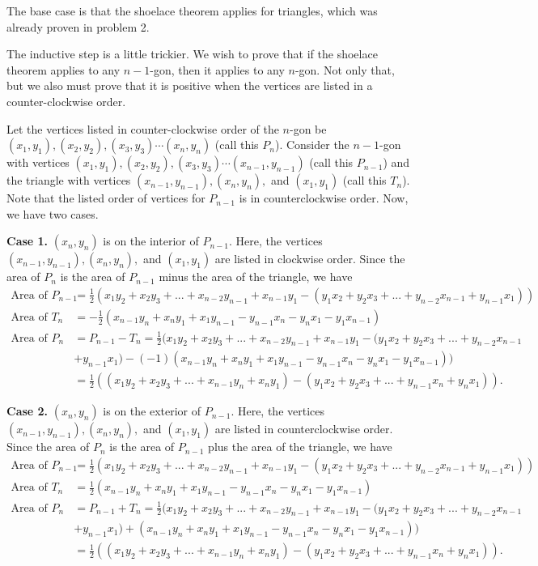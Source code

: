 \documentclass[11pt]{article}
\begin{document}
\begin{solution}
The base case is that the shoelace theorem applies for triangles, which was already proven in problem 2.

The inductive step is a little trickier. We wish to prove that if the shoelace theorem applies to any $n-1$-gon, then it applies to any $n$-gon. Not only that, but we also must prove that it is positive when the vertices are listed in a counter-clockwise order.

Let the vertices listed in counter-clockwise order of the $n$-gon be $(x_1, y_1), (x_2, y_2), (x_3, y_3) \cdots (x_n, y_n)$ (call this $P_n$). Consider the $n-1$-gon with vertices $(x_1, y_1), (x_2, y_2), (x_3, y_3) \cdots (x_{n-1}, y_{n-1})$ (call this $P_{n-1}$) and the triangle with vertices $(x_{n-1}, y_{n-1}), (x_n, y_n),$ and $(x_1, y_1)$ (call this $T_n$). Note that the listed order of vertices for $P_{n-1}$ is in counterclockwise order. Now, we have two cases.

\textbf{Case 1.} $(x_n, y_n)$ is on the interior of $P_{n-1}$.
Here, the vertices $(x_{n-1}, y_{n-1}), (x_n, y_n),$ and $(x_1, y_1)$ are listed in clockwise order. Since the area of $P_n$ is the area of $P_{n-1}$ minus the area of the triangle, we have 
\begin{align*}
    \textrm{Area of } P_{n-1} &= \frac{1}{2}(x_1y_2 + x_2y_3 + ... + x_{n-2}y_{n-1} + x_{n-1}y_1-(y_1x_2 + y_2x_3 + ... + y_{n-2}x_{n-1} + y_{n-1}x_1)) \\
    \textrm{Area of } T_n &= -\frac{1}{2}(x_{n-1}y_n+x_ny_1+x_1y_{n-1}-y_{n-1}x_n-y_nx_1-y_1x_{n-1}) \\
    \textrm{Area of }P_n &= P_{n-1} - T_n = \frac{1}{2}(x_1y_2 + x_2y_3 + ... + x_{n-2}y_{n-1} + x_{n-1}y_1-(y_1x_2 + y_2x_3 + ... + y_{n-2}x_{n-1} \\
    &+ y_{n-1}x_1) - (-1)(x_{n-1}y_n+x_ny_1+x_1y_{n-1}-y_{n-1}x_n-y_nx_1-y_1x_{n-1})) \\
    &= \frac{1}{2}((x_1y_2 + x_2y_3 + ... + x_{n-1}y_n + x_ny_1) - (y_1x_2 + y_2x_3 + ... + y_{n-1}x_n + y_nx_1)).
\end{align*}

\textbf{Case 2.} $(x_n, y_n)$ is on the exterior of $P_{n-1}$.
Here, the vertices $(x_{n-1}, y_{n-1}), (x_n, y_n),$ and $(x_1, y_1)$ are listed in counterclockwise order. Since the area of $P_n$ is the area of $P_{n-1}$ plus the area of the triangle, we have 
\begin{align*}
    \textrm{Area of } P_{n-1} &= \frac{1}{2}(x_1y_2 + x_2y_3 + ... + x_{n-2}y_{n-1} + x_{n-1}y_1-(y_1x_2 + y_2x_3 + ... + y_{n-2}x_{n-1} + y_{n-1}x_1)) \\
    \textrm{Area of } T_n &= \frac{1}{2}(x_{n-1}y_n+x_ny_1+x_1y_{n-1}-y_{n-1}x_n-y_nx_1-y_1x_{n-1}) \\
    \textrm{Area of }P_n &= P_{n-1} + T_n = \frac{1}{2}(x_1y_2 + x_2y_3 + ... + x_{n-2}y_{n-1} + x_{n-1}y_1-(y_1x_2 + y_2x_3 + ... + y_{n-2}x_{n-1} \\
    &+ y_{n-1}x_1) + (x_{n-1}y_n+x_ny_1+x_1y_{n-1}-y_{n-1}x_n-y_nx_1-y_1x_{n-1})) \\
    &= \frac{1}{2}((x_1y_2 + x_2y_3 + ... + x_{n-1}y_n + x_ny_1) - (y_1x_2 + y_2x_3 + ... + y_{n-1}x_n + y_nx_1)).
\end{align*}
\end{solution}
\end{document}
